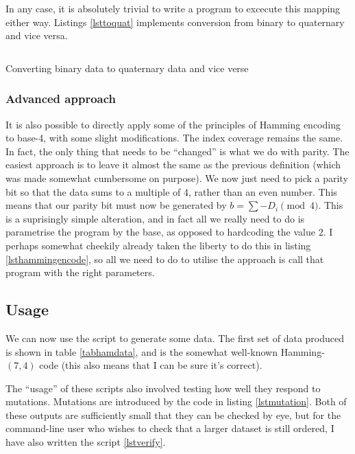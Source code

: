\documentclass[a4paper,11pt]{article}
\newenvironment{longlisting}
{\addvspace{\baselineskip}\captionsetup{type=listing}}
{\addvspace{\baselineskip}}
\begin{document}
    In any case, it is absolutely trivial to write a program to excecute this
    mapping either way. Listings \ref{lsttoquat} implements conversion from
    binary to quaternary and vice versa.

\begin{longlisting}
\inputminted{python}{../src/to_quat.py}
\caption{Converting binary data to quaternary data and vice verse}
\label{lsttoquat}
\end{longlisting}

    \subsubsection{Advanced approach}

    It is also possible to directly apply some of the principles of Hamming
    encoding to base-4, with some slight modifications. The index coverage
    remains the same. In fact, the only thing that needs to be ``changed'' is
    what we do with parity. The easiest approach is to leave it almost the same
    as the previous definition (which was made somewhat cumbersome on purpose).
    We now just need to pick a parity bit so that the data sums to a multiple of
    4, rather than an even number. This means that our parity bit must now be
    generated by $b = \sum -D_i \pmod 4$. This is a suprisingly simple
    alteration, and in fact all we really need to do is parametrise the program
    by the base, as opposed to hardcoding the value $2$. I perhaps somewhat
    cheekily already taken the liberty to do this in listing
    \ref{lsthammingencode}, so all we need to do to utilise the approach is call
    that program with the right parameters.

    \subsection{Usage}

    We can now use the script to generate some data. The first set of data
    produced is shown in table \ref{tabhamdata}, and is the somewhat well-known
    Hamming-$(7,4)$ code \cite{WikiHamming74} (this also means that I can be
    sure it's correct).

    The ``usage'' of these scripts also involved testing how well they respond
    to mutations. Mutations are introduced by the code in listing
    \ref{lstmutation}. Both of these outputs are sufficiently small that they
    can be checked by eye, but for the command-line user who wishes to check
    that a larger dataset is still ordered, I have also written the script
    \ref{lstverify}.
\end{document}
